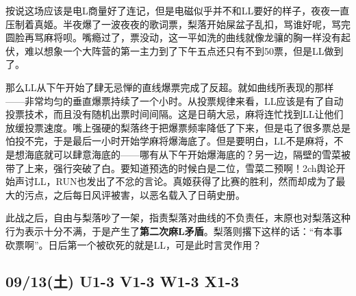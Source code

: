 按说这场应该是电L商量好了连记，但是电磁似乎并不和LL要好的样子，夜夜一直压制着真姬。半夜爆了一波夜夜的歌词票，梨落开始屎盆子乱扣，骂谁好呢，骂完圆脸再骂麻将呗。嘴瘾过了，票没动，这一平如洗的曲线就像龙骧的胸一样没有起伏，难以想象一个大阵营的第一主力到了下午五点还只有不到50票，但是LL做到了。

那么LL从下午开始了肆无忌惮的直线爆票完成了反超。就如曲线所表现的那样——非常均匀的垂直爆票持续了一个小时。从投票规律来看，LL应该是有了自动投票技术，而且没有随机出票时间间隔。这是日萌大忌，麻将连忙找到LL让他们放缓投票速度。嘴上强硬的梨落终于把爆票频率降低了下来，但是屯了很多票总是怕投不完，于是最后一小时开始学麻将爆海底了。但是要明白，LL不是麻将，不是想海底就可以肆意海底的——哪有从下午开始爆海底的？另一边，隔壁的雪菜被带了上来，强行突破了白。要知道预选的时候白是二位，雪菜二预啊！2ch舆论开始声讨LL，RUN也发出了不忿的言论。真姬获得了比赛的胜利，然而却成为了最大的污点，之后每日风评被害，以恶名载入了日萌史册。

此战之后，自由与梨落吵了一架，指责梨落对曲线的不负责任，末原也对梨落这种行为表示十分不满，于是产生了\textbf{第二次麻L矛盾}。梨落则撂下这样的话：“有本事砍票啊”。日后第一个被砍死的就是LL，可是此时言灵作用？

\subsection{09/13(土) U1-3 V1-3 W1-3 X1-3}



